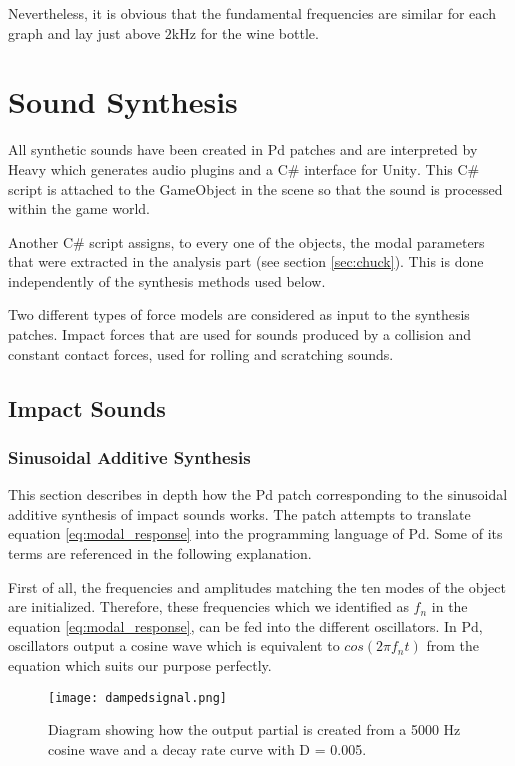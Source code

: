 Nevertheless, it is obvious that the fundamental frequencies are similar for each graph and lay just above $2$kHz for the wine bottle.

\section{Sound Synthesis}\label{sec:synthesis_implem}

All synthetic sounds have been created in \gls{Pd} patches and are interpreted by Heavy which generates audio plugins and a C\# interface for Unity\textsuperscript{\textregistered}. This C\# script is attached to the GameObject in the scene so that the sound is processed within the game world.


Another C\# script assigns, to every one of the objects, the modal parameters that were extracted in the analysis part (see section \ref{sec:chuck}). This is done independently of the synthesis methods used below.

Two different types of force models are considered as input to the synthesis patches. Impact forces that are used for sounds produced by a collision and constant contact forces, used for rolling and scratching sounds.

\subsection{Impact Sounds}\label{sec:impact_synth}
\subsubsection{Sinusoidal Additive Synthesis}\label{sec:sinusoidal_synth}

This section describes in depth how the \gls{Pd} patch corresponding to the sinusoidal additive synthesis of impact sounds works. The patch attempts to translate equation \ref{eq:modal_response} into the programming language of \gls{Pd}. Some of its terms are referenced in the following explanation.

First of all, the frequencies and amplitudes matching the ten modes of the object are initialized. Therefore, these frequencies which we identified as $f_n$ in the equation \ref{eq:modal_response}, can be fed into the different oscillators. In \gls{Pd}, oscillators output a cosine wave which is equivalent to $cos(2 \pi f_nt)$ from the equation which suits our purpose perfectly.

\begin{figure}[H]
  \centering
    \texttt{[image: dampedsignal.png]}
      \caption{Diagram showing how the output partial is created from a 5000 Hz cosine wave and a decay rate curve with D = 0.005.}
      \label{fig:dampedsignal}
\end{figure}


